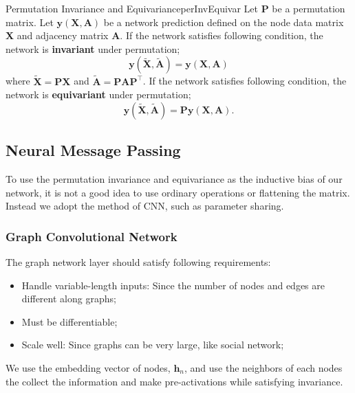 \documentclass{article}
\begin{document}
        \begin{defn}{Permutation Invariance and Equivariance}{perInvEquivar}
            Let \textbf{P} be a permutation matrix. Let $\textbf{y}(\textbf{X}, \textbf{A})$ be a network prediction defined on the
            node data matrix \textbf{X} and adjacency matrix \textbf{A}. If the network satisfies following condition, the
            network is \textbf{invariant} under permutation;
            \[
            \mathbf{y}(\tilde{\mathbf{X}}, \tilde{\mathbf{A}})=\mathbf{y}(\mathbf{X}, \mathbf{A})   
            \]
            where $\tilde{\mathbf{X}}=\mathbf{PX}$ and $\tilde{\mathbf{A}}=\mathbf{PA}\mathbf{P}^{\top}$.
            If the network satisfies following condition, the network is \textbf{equivariant} under permutation;
            \[
            \mathbf{y}(\tilde{\mathbf{X}}, \tilde{\mathbf{A}})=\mathbf{P}\mathbf{y}(\mathbf{X}, \mathbf{A}).
            \]
        \end{defn}

    \subsection{Neural Message Passing}
        To use the permutation invariance and equivariance as the inductive bias of our network, it is not a good idea to
        use ordinary operations or flattening the matrix. Instead we adopt the method of CNN, such as parameter sharing.
        \subsubsection{Graph Convolutional Network}
            The graph network layer should satisfy following requirements:
                \begin{itemize}
                    \item Handle variable-length inputs: Since the number of nodes and edges are different along graphs;
                    \item Must be differentiable;
                    \item Scale well: Since graphs can be very large, like social network;
                \end{itemize}

            We use the embedding vector of nodes, $\textbf{h}_n$, and use the neighbors of each nodes the collect the information
            and make pre-activations while satisfying invariance.
\end{document}
